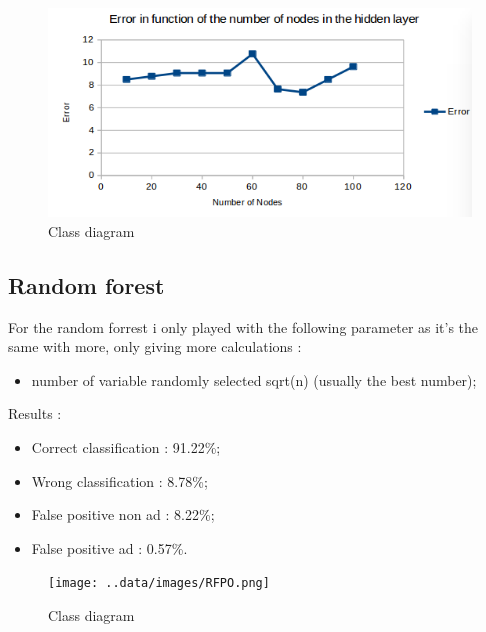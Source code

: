   \begin{figure}[h]
   \centering
   \includegraphics[scale=0.5]{../images/NNPO.png}
   \caption{Class diagram}
  \end{figure}

\subsection{Random forest}
For the random forrest i only played with the following parameter as it's the same with more, only giving more calculations :
  \begin{itemize}
    \item number of variable randomly selected sqrt(n) (usually the best number);
  \end{itemize}
Results :
\begin{itemize}
  \item Correct classification : 91.22\%;
  \item Wrong classification : 8.78\%;
  \item False positive non ad : 8.22\%;
  \item False positive ad : 0.57\%.
\end{itemize}

\begin{figure}[h]
 \centering
 \texttt{[image: ..data/images/RFPO.png]}
 \caption{Class diagram}
\end{figure}
